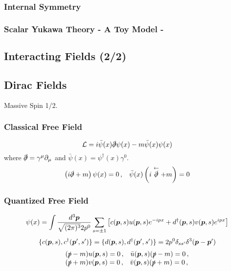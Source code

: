 \documentclass{article}
\newcommand{\bld}[1]{\mbox{\boldmath $#1$}}
\newcommand{\qftsrcdirectory}[0]{./}
\begin{document}
\subsubsection{Internal Symmetry}

\subsubsection{Scalar Yukawa Theory - A Toy Model -}


\subsection{Interacting Fields (2/2)}




\newpage
\subsection{Dirac Fields}
Massive Spin 1/2.
\subsubsection{Classical Free Field}
\begin{equation}
{\cal L} = i \bar{\psi}(x) \slashed{\partial} \psi(x) - m \bar{\psi}(x) \psi(x)
\end{equation}
where $\slashed{\partial} = \gamma^\mu \partial_\mu$ and
$\bar{\psi}(x) = \psi^\dagger (x) \gamma^0$.
\begin{equation}
\left(i \slashed{\partial} + m \right) \psi(x) = 0\,,
\hspace{3mm}
\bar{\psi}(x) \left(i \stackrel{\leftarrow}{\slashed{\partial}} + m \right)  = 0
\end{equation}
\subsubsection{Quantized Free Field}
\begin{equation}
\psi(x) 
=
\int \frac{d^3 \bld{p}}{\sqrt{(2\pi)^3} 2 p^0}
\sum_{s = \pm 1}
\left[
c(\bld{p}, s) u(\bld{p}, s) e^{-ipx}
+
d^\dagger(\bld{p}, s) v(\bld{p}, s) e^{ipx}
\right]
\end{equation}
\begin{equation}
\{ c(\bld{p}, s), c^\dagger(\bld{p}', s') \}
=
\{ d(\bld{p}, s), d^\dagger(\bld{p}', s') \}
=
2p^0 \delta_{ss'}
\delta^3(\bld{p} - \bld{p}')
\end{equation}
\begin{equation}
\begin{array}{l}
(\slashed{p} - m) u(\bld{p}, s) = 0\,,
\hspace{3mm}
\bar{u}(\bld{p}, s)(\slashed{p} - m)  = 0\,,
\\
(\slashed{p} + m) v(\bld{p}, s) = 0\,,
\hspace{3mm}
\bar{v}(\bld{p}, s)(\slashed{p} + m)  = 0\,,
\end{array}
\end{equation}
\end{document}
